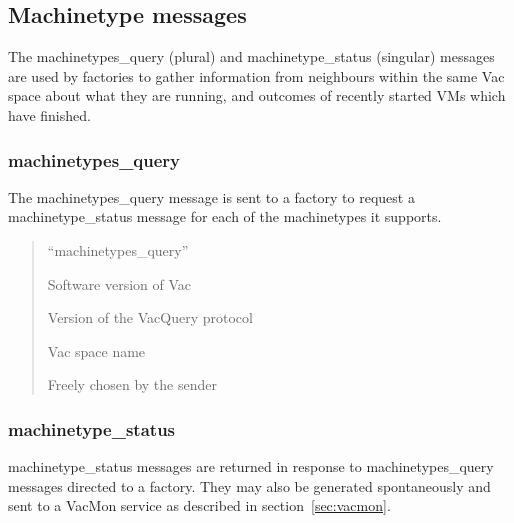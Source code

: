 \documentclass[12pt,a4paper]{article}
\begin{document}
\subsection{Machinetype messages}
\label{sec:machinetypemessages}

The machinetypes\_query (plural) and machinetype\_status (singular) messages 
are used by factories to gather information from neighbours within the
same Vac space about what they are running, and outcomes of recently started
VMs which have finished.

\subsubsection{machinetypes\_query}
\label{sec:machinetypesquery}

The machinetypes\_query message is sent to a factory to request a 
machinetype\_status message for each of the machinetypes it supports.

\begin{quote}
\begin{description}
\setlength{\parskip}{0pt}
\item[message\_type] ``machinetypes\_query''
\item[vac\_version] Software version of Vac
\item[vacquery\_version] Version of the VacQuery protocol
\item[space] Vac space name
\item[cookie] Freely chosen by the sender
\end{description}
\end{quote}

\subsubsection{machinetype\_status}
\label{sec:machinetypestatus}

machinetype\_status messages are returned in response to machinetypes\_query 
messages directed to a factory. They may
also be generated spontaneously and sent to a VacMon
service as described in section~\ref{sec:vacmon}.
\end{document}
